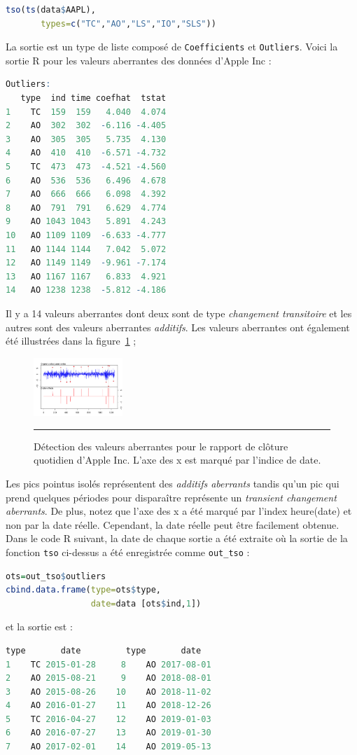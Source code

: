 \begin{lstlisting}[language=R]
tso(ts(data$AAPL), 
       types=c("TC","AO","LS","IO","SLS"))
\end{lstlisting}
La sortie est un type de liste composé de \verb|Coefficients| et \verb|Outliers|. Voici la sortie R pour les valeurs aberrantes des données d'Apple Inc :
\begin{lstlisting}[language=R]
Outliers:
   type  ind time coefhat  tstat
1    TC  159  159   4.040  4.074
2    AO  302  302  -6.116 -4.405
3    AO  305  305   5.735  4.130
4    AO  410  410  -6.571 -4.732
5    TC  473  473  -4.521 -4.560
6    AO  536  536   6.496  4.678
7    AO  666  666   6.098  4.392
8    AO  791  791   6.629  4.774
9    AO 1043 1043   5.891  4.243
10   AO 1109 1109  -6.633 -4.777
11   AO 1144 1144   7.042  5.072
12   AO 1149 1149  -9.961 -7.174
13   AO 1167 1167   6.833  4.921
14   AO 1238 1238  -5.812 -4.186
\end{lstlisting}
Il y a 14 valeurs aberrantes dont deux sont de type \textit{changement transitoire} et les autres sont des valeurs aberrantes \textit{additifs}. Les valeurs aberrantes ont également été illustrées dans la figure~\ref{fig:apoutlier} ; 
\begin{figure}[t]
\centering
\includegraphics[width=0.30\textwidth]{ADOA/Images/Apoutliers.png}
\caption[\small Détection des valeurs aberrantes pour le rendement quotidien de clôture d'Apple Inc.]{\small Détection des valeurs aberrantes pour le rapport de clôture quotidien d'Apple Inc. L'axe des x est marqué par l'indice de date.}
\hrule\label{fig:apoutlier}
\end{figure}
\afterpage{\FloatBarrier}
Les pics pointus isolés représentent des \textit{additifs aberrants} tandis qu'un pic qui prend quelques périodes pour disparaître représente un \textit{transient changement aberrants}. De plus, notez que l'axe des x a été marqué par l'index heure(date) et non par la date réelle. Cependant, la date réelle peut être facilement obtenue. Dans le code R suivant, la date de chaque sortie a été extraite où la sortie de la fonction \verb|tso| ci-dessus a été enregistrée comme \verb|out_tso| :
\begin{lstlisting}[language=R]
ots=out_tso$outliers
cbind.data.frame(type=ots$type,
                 date=data [ots$ind,1])
\end{lstlisting}
et la sortie est :
\newpage
\begin{lstlisting}[language=R]
   type       date         type       date
1    TC 2015-01-28     8    AO 2017-08-01
2    AO 2015-08-21     9    AO 2018-08-01
3    AO 2015-08-26    10    AO 2018-11-02  
4    AO 2016-01-27    11    AO 2018-12-26
5    TC 2016-04-27    12    AO 2019-01-03
6    AO 2016-07-27    13    AO 2019-01-30
7    AO 2017-02-01    14    AO 2019-05-13
\end{lstlisting}
